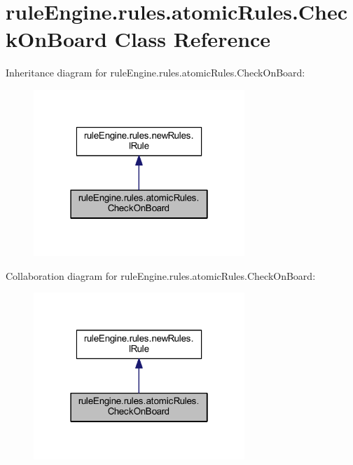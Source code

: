 \hypertarget{classrule_engine_1_1rules_1_1atomic_rules_1_1_check_on_board}{}\section{rule\+Engine.\+rules.\+atomic\+Rules.\+Check\+On\+Board Class Reference}
\label{classrule_engine_1_1rules_1_1atomic_rules_1_1_check_on_board}


Inheritance diagram for rule\+Engine.\+rules.\+atomic\+Rules.\+Check\+On\+Board\+:
\nopagebreak
\begin{figure}[H]
\begin{center}
\leavevmode
\includegraphics[width=226pt]{classrule_engine_1_1rules_1_1atomic_rules_1_1_check_on_board__inherit__graph}
\end{center}
\end{figure}


Collaboration diagram for rule\+Engine.\+rules.\+atomic\+Rules.\+Check\+On\+Board\+:
\nopagebreak
\begin{figure}[H]
\begin{center}
\leavevmode
\includegraphics[width=226pt]{classrule_engine_1_1rules_1_1atomic_rules_1_1_check_on_board__coll__graph}
\end{center}
\end{figure}
